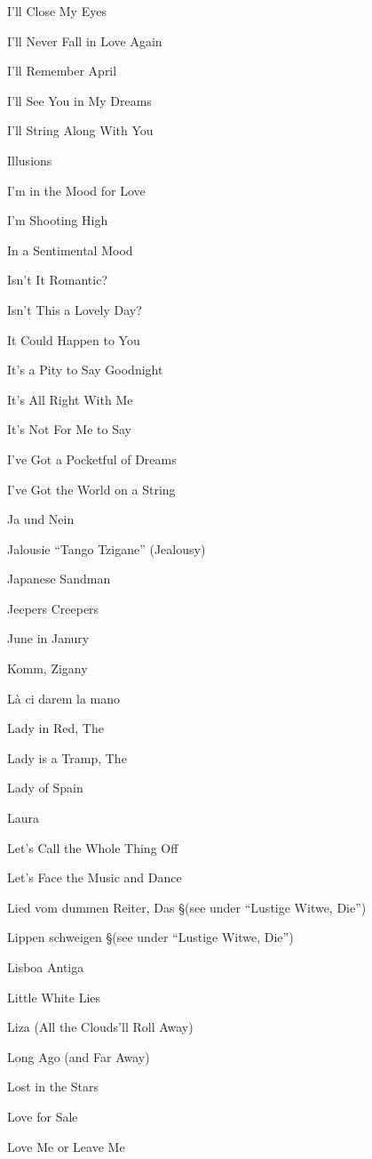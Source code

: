 \N I'll Close My Eyes

\N I'll Never Fall in Love Again

\N I'll Remember April

\N I'll See You in My Dreams

\N I'll String Along With You

\N Illusions

\N I'm in the Mood for Love

\N I'm Shooting High

\N In a Sentimental Mood

\N Isn't It Romantic?

\N Isn't This a Lovely Day?

\N It Could Happen to You

\N It's a Pity to Say Goodnight

\N It's All Right With Me

\N It's Not For Me to Say

\N I've Got a Pocketful of Dreams

\N I've Got the World on a String

\N Ja und Nein

\N Jalousie ``Tango Tzigane'' (Jealousy)

\N Japanese Sandman

\N Jeepers Creepers

\N June in Janury

\N Komm, Zigany

\N L{\`a} ci darem la mano

\N Lady in Red, The

\N Lady is a Tramp, The

\N Lady of Spain

\N Laura

\N Let's Call the Whole Thing Off

\N Let's Face the Music and Dance

\N Lied vom dummen Reiter, Das
\nobreak
\S (see under ``Lustige Witwe, Die'')

\N Lippen schweigen
\nobreak
\S (see under ``Lustige Witwe, Die'')

\N Lisboa Antiga

\N Little White Lies

\N Liza (All the Clouds'll Roll Away)

\N Long Ago (and Far Away)

\N Lost in the Stars

\N Love for Sale

\N Love Me or Leave Me


